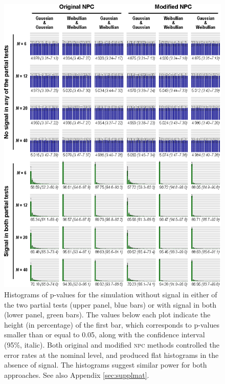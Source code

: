\begin{figure}[p]
\begin{center}
\centerline{\includegraphics{images/validity_hist.eps}}
\end{center}
\vspace{-3mm}
\caption[Histograms of p-values for the simulations.]{Histograms of p-values for the simulation without signal in either of the two partial tests (upper panel, blue bars) or with signal in both (lower panel, green bars). The values below each plot indicate the height (in percentage) of the first bar, which corresponds to p-values smaller than or equal to 0.05, along with the confidence interval (95\%, italic). Both original and modified \textsc{npc} methods controlled the error rates at the nominal level, and produced flat histograms in the absence of signal. The histograms suggest similar power for both approaches. See also Appendix \ref{sec:supplmat}.}
\label{fig:comb:validity_hist}
\end{figure}

